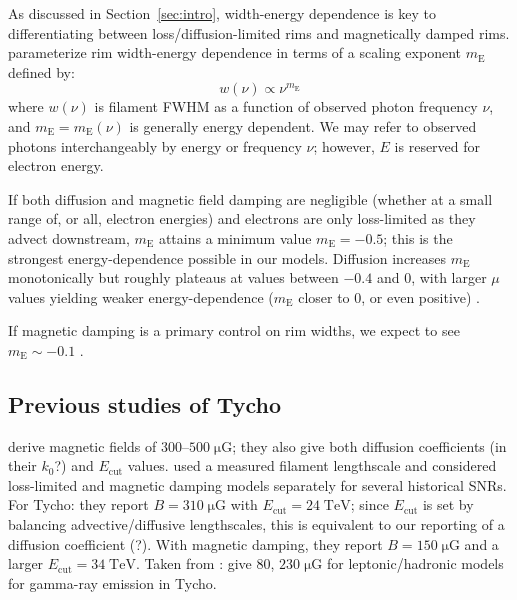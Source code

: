 \documentclass[iop, apj, numberedappendix, twocolappendix]{emulateapj}
\newcommand*{\mt}{\mathrm}
\newcommand*{\unit}[1]{\;\mt{#1}}  %
\newcommand*{\mE}{m_\mt{E}}
\newcommand*{\Ecut}{E_{\mt{cut}}}
\begin{document}
As discussed in Section~\ref{sec:intro}, width-energy dependence is key to
differentiating between loss/diffusion-limited rims and magnetically damped
rims.   parameterize rim width-energy dependence in
terms of a scaling exponent $\mE$ defined by:
\begin{equation}
    w(\nu) \propto \nu^{\mE}
\end{equation}
where $w(\nu)$ is filament FWHM as a function of observed photon frequency
$\nu$, and $\mE = \mE(\nu)$ is generally energy dependent.  We may refer to
observed photons interchangeably by energy or frequency $\nu$; however, $E$ is
reserved for electron energy.

If both diffusion and magnetic field damping are negligible (whether at a small
range of, or all, electron energies) and electrons are only loss-limited as
they advect downstream, $\mE$ attains a minimum value $\mE = -0.5$; this is the
strongest energy-dependence possible in our models.  Diffusion increases $\mE$
monotonically but roughly plateaus at values between $-0.4$ and $0$, with
larger $\mu$ values yielding weaker energy-dependence ($\mE$ closer to $0$, or
even positive) .

If magnetic damping is a primary control on rim widths, we expect to see $\mE
\sim -0.1$ .

\subsection{Previous studies of Tycho}

\citet{parizot2006} derive magnetic fields of $300$--$500 \unit{\mu G}$; they
also give both diffusion coefficients (in their $k_0$?) and $\Ecut$ values.
\citet{rettig2012} used a measured filament lengthscale and considered
loss-limited and magnetic damping models separately for several historical
SNRs.  For Tycho: they report $B = 310 \unit{\mu G}$ with $\Ecut = 24
\unit{TeV}$; since $\Ecut$ is set by balancing advective/diffusive
lengthscales, this is equivalent to our reporting of a diffusion coefficient
(?).  With magnetic damping, they report $B = 150 \unit{\mu G}$ and a larger
$\Ecut = 34 \unit{TeV}$.  Taken from \citet{rettig2012}: \citet{acciari2011}
give $80$, $230 \unit{\mu G}$ for leptonic/hadronic models for gamma-ray
emission in Tycho.
\end{document}
